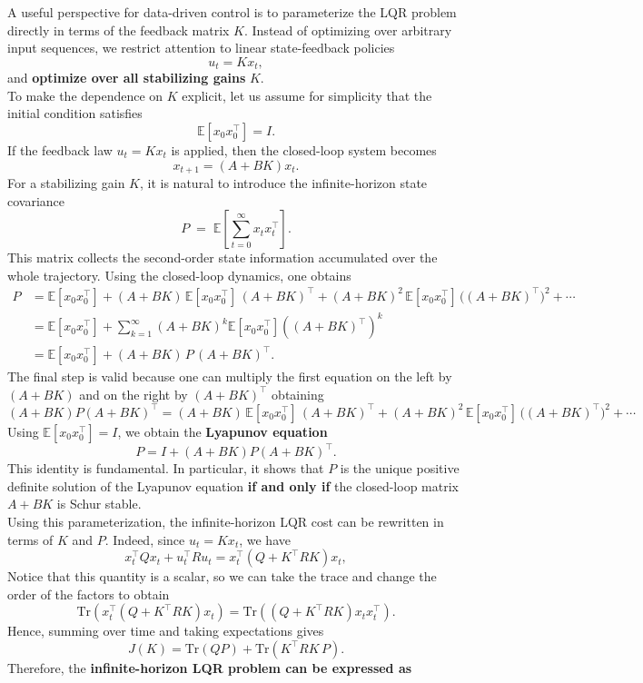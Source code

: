 A useful perspective for data-driven control is to parameterize the LQR problem directly in
terms of the feedback matrix $K$. Instead of optimizing over arbitrary input sequences, we
restrict attention to linear state-feedback policies
\[
u_t = K x_t,
\]
and \textbf{optimize over all stabilizing gains} $K$.\\
To make the dependence on $K$ explicit, let us assume for simplicity that the initial condition
satisfies
\[
\mathbb E[x_0 x_0^\top] = I.
\]
If the feedback law $u_t = Kx_t$ is applied, then the closed-loop system becomes
\[
x_{t+1} = (A+BK)x_t.
\]
For a stabilizing gain $K$, it is natural to introduce the infinite-horizon state covariance
\[
P \;=\; \mathbb E\!\left[\sum_{t=0}^{\infty} x_t x_t^\top\right].
\]
This matrix collects the second-order state information accumulated over the whole trajectory.
Using the closed-loop dynamics, one obtains
\begin{align*}
P
&= \mathbb E[x_0x_0^\top]
+ (A+BK)\,\mathbb E[x_0x_0^\top]\,(A+BK)^\top
+ (A+BK)^2\,\mathbb E[x_0x_0^\top]\,\big((A+BK)^\top\big)^2 
+ \cdots \\
&= \mathbb{E} [x_0x_0^\top] + \sum_{k=1}^{\infty} (A+BK)^k \mathbb{E}[x_0x_0^\top] ((A+BK)^\top)^k \\
&= \mathbb E[x_0x_0^\top] + (A+BK)\,P\,(A+BK)^\top.
\end{align*}
The final step is valid because one can multiply the first equation on the left by $(A+BK)$ and on the right by $(A+BK)^\top$ obtaining
$$
(A+BK)P(A+BK)^\top = (A+BK)\,\mathbb E[x_0x_0^\top]\,(A+BK)^\top + (A+BK)^2\,\mathbb E[x_0x_0^\top]\,\big((A+BK)^\top\big)^2 + \cdots
$$
Using $\mathbb E[x_0x_0^\top]=I$, we obtain the \textbf{Lyapunov equation}
\[
P = I + (A+BK)P(A+BK)^\top.
\]
This identity is fundamental. In particular, it shows that $P$ is the unique positive definite
solution of the Lyapunov equation \textbf{if and only if} the closed-loop matrix $A+BK$ is Schur
stable.\\
Using this parameterization, the infinite-horizon LQR cost can be rewritten in terms of $K$
and $P$. Indeed, since $u_t = Kx_t$, we have
\[
x_t^\top Q x_t + u_t^\top R u_t
= x_t^\top (Q + K^\top R K)x_t,
\]
Notice that this quantity is a scalar, so we can take the trace and change the order of the factors to obtain
\[
\mathrm{Tr}(x_t^\top (Q + K^\top R K)x_t) = \mathrm{Tr}((Q + K^\top R K)x_t x_t^\top).
\]
Hence, summing over time and taking expectations gives
\[
J(K)
=
\mathrm{Tr}(QP) + \mathrm{Tr}(K^\top R K\, P).
\]
Therefore, the \textbf{infinite-horizon LQR problem can be expressed as}
